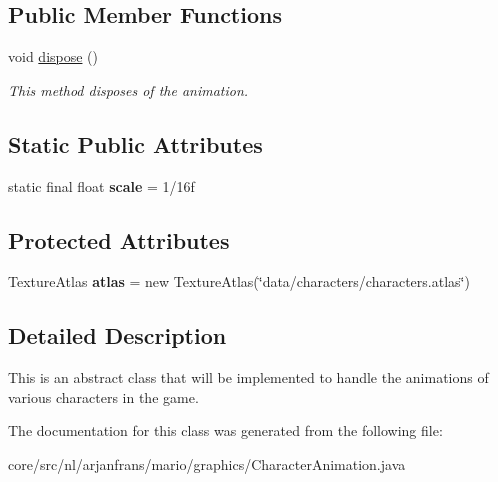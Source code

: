 \subsection*{Public Member Functions}
\begin{DoxyCompactItemize}
\item 
\mbox{\label{classnl_1_1arjanfrans_1_1mario_1_1graphics_1_1CharacterAnimation_a880fedd9a315fa5f2ad2aa1e51b9f05e}} 
void \hyperlink{classnl_1_1arjanfrans_1_1mario_1_1graphics_1_1CharacterAnimation_a880fedd9a315fa5f2ad2aa1e51b9f05e}{dispose} ()
\begin{DoxyCompactList}\small\item\em This method disposes of the animation. \end{DoxyCompactList}\end{DoxyCompactItemize}
\subsection*{Static Public Attributes}
\begin{DoxyCompactItemize}
\item 
\mbox{\label{classnl_1_1arjanfrans_1_1mario_1_1graphics_1_1CharacterAnimation_a940a01ff1fb29a7a4814e2be10d78122}} 
static final float {\bfseries scale} = 1/16f
\end{DoxyCompactItemize}
\subsection*{Protected Attributes}
\begin{DoxyCompactItemize}
\item 
\mbox{\label{classnl_1_1arjanfrans_1_1mario_1_1graphics_1_1CharacterAnimation_a164e4424f77ef8d425d21e3f3553e5ca}} 
Texture\+Atlas {\bfseries atlas} = new Texture\+Atlas(\char`\"{}data/characters/characters.\+atlas\char`\"{})
\end{DoxyCompactItemize}


\subsection{Detailed Description}
This is an abstract class that will be implemented to handle the animations of various characters in the game. 

The documentation for this class was generated from the following file\+:\begin{DoxyCompactItemize}
\item 
core/src/nl/arjanfrans/mario/graphics/Character\+Animation.\+java\end{DoxyCompactItemize}
